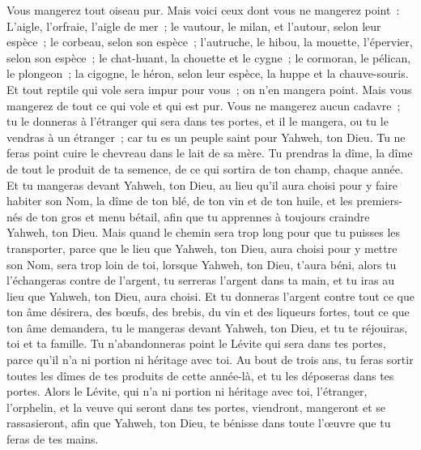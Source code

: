\begin{multicols}{2}
Vous mangerez tout oiseau pur.
Mais voici ceux dont vous ne mangerez point~: L'aigle, l'orfraie, l'aigle de mer~;
le vautour, le milan, et l'autour, selon leur espèce~;
le corbeau, selon son espèce~;
l'autruche, le hibou, la mouette, l'épervier, selon son espèce~;
le chat-huant, la chouette et le cygne~;
le cormoran, le pélican, le plongeon~;
la cigogne, le héron, selon leur espèce, la huppe et la chauve-souris.
Et tout reptile qui vole sera impur pour vous~; on n'en mangera point.
Mais vous mangerez de tout ce qui vole et qui est pur.
Vous ne mangerez aucun cadavre~; tu le donneras à l'étranger qui sera dans tes portes, et il le mangera, ou tu le vendras à un étranger~; car tu es un peuple saint pour Yahweh, ton Dieu. Tu ne feras point cuire le chevreau dans le lait de sa mère.
Tu prendras la dîme, la dîme de tout le produit de ta semence, de ce qui sortira de ton champ, chaque année.
Et tu mangeras devant Yahweh, ton Dieu, au lieu qu'il aura choisi pour y faire habiter son Nom, la dîme de ton blé, de ton vin et de ton huile, et les premiers-nés de ton gros et menu bétail, afin que tu apprennes à toujours craindre Yahweh, ton Dieu.
Mais quand le chemin sera trop long pour que tu puisses les transporter, parce que le lieu que Yahweh, ton Dieu, aura choisi pour y mettre son Nom, sera trop loin de toi, lorsque Yahweh, ton Dieu, t'aura béni,
alors tu l'échangeras contre de l'argent, tu serreras l'argent dans ta main, et tu iras au lieu que Yahweh, ton Dieu, aura choisi.
Et tu donneras l'argent contre tout ce que ton âme désirera, des bœufs, des brebis, du vin et des liqueurs fortes, tout ce que ton âme demandera, tu le mangeras devant Yahweh, ton Dieu, et tu te réjouiras, toi et ta famille.
Tu n'abandonneras point le Lévite qui sera dans tes portes, parce qu'il n'a ni portion ni héritage avec toi.
Au bout de trois ans, tu feras sortir toutes les dîmes de tes produits de cette année-là, et tu les déposeras dans tes portes.
Alors le Lévite, qui n'a ni portion ni héritage avec toi, l'étranger, l'orphelin, et la veuve qui seront dans tes portes, viendront, mangeront et se rassasieront, afin que Yahweh, ton Dieu, te bénisse dans toute l'œuvre que tu feras de tes mains.

\end{multicols}

